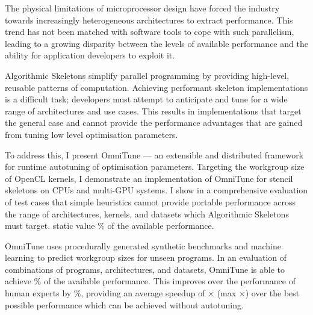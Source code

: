 The physical limitations of microprocessor design have forced the
industry towards increasingly heterogeneous architectures to extract
performance. This trend has not been matched with software tools to
cope with such parallelism, leading to a growing disparity between the
levels of available performance and the ability for application
developers to exploit it.

Algorithmic Skeletons simplify parallel programming by providing
high-level, reusable patterns of computation. Achieving performant
skeleton implementations is a difficult task; developers must attempt
to anticipate and tune for a wide range of architectures and use
cases. This results in implementations that target the general case
and cannot provide the performance advantages that are gained from
tuning low level optimisation parameters.

To address this, I present OmniTune --- an extensible and distributed
framework for runtime autotuning of optimisation parameters. Targeting
the workgroup size of OpenCL kernels, I demonstrate an implementation
of OmniTune for stencil skeletons on CPUs and multi-GPU systems. I
show in a comprehensive evaluation of 
test cases that simple heuristics cannot provide portable performance
across the range of architectures, kernels, and datasets which
Algorithmic Skeletons must target. static value
\% of the available performance.

OmniTune uses procedurally generated synthetic benchmarks and machine
learning to predict workgroup sizes for unseen programs. In an
evaluation of  combinations of programs,
architectures, and datasets, OmniTune is able to achieve
$\%$ of the available
performance. This improves over the performance of human experts by
$\%$, providing an
average speedup of $\times$
(max $\times$) over the
best possible performance which can be achieved without autotuning.

